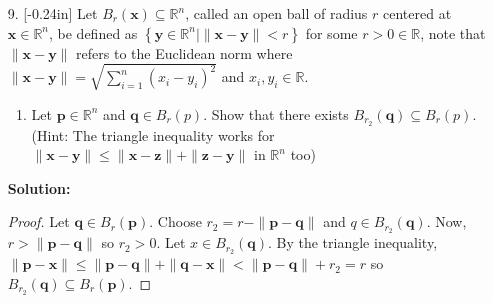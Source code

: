\documentclass[letterpaper,12pt]{article}
\newcommand{\set}[1]{\left\{ #1 \right\}}
\theoremstyle{definition}
\begin{document}
\pagebreak
\begin{enumerate}
    \item[9.] \reversemarginpar{}[-0.24in] 
 Let $B_r(\mathbf{x}) \subseteq \mathbb{R}^n$, called an open ball of radius $r$ centered at $\mathbf{x} \in \mathbb{R}^n$, be defined as $\set{\mathbf{y} \in \mathbb{R}^n | \| \mathbf{x}-\mathbf{y} \| < r}$ for some $r > 0 \in \mathbb{R}$, note that $\| \mathbf{x}-\mathbf{y} \|$ refers to the Euclidean norm where $\| \mathbf{x}-\mathbf{y} \| = \sqrt{\sum_{i=1}^n (x_i - y_i)^2}$ and $x_i,y_i \in \mathbb{R}$. \begin{enumerate}
        \item Let $\mathbf{p} \in \mathbb{R}^n$ and $\mathbf{q} \in B_r(p)$. Show that there exists $B_{r_2}(\mathbf{q}) \subseteq B_r(p)$. (Hint: The triangle inequality works for $\|\mathbf{x} - \mathbf{y}\| \leq \|\mathbf{x} - \mathbf{z}\| + \|\mathbf{z} -\mathbf{y} \|$ in $\mathbb{R}^n$ too)
    \end{enumerate}
      \begin{mdframed}
            \textbf{Solution:}
            \begin{proof}
                Let $\mathbf{q} \in B_r(\mathbf{p})$. Choose $r_2 = r - \| \mathbf{p}-\mathbf{q}\|$ and $q \in B_{r_2}(\mathbf{q})$. Now, $r > \|  \mathbf{p}-\mathbf{q}\|$ so $r_2 > 0$. Let $x \in B_{r_2}(\mathbf{q})$. By the triangle inequality, $\|\mathbf{p}-\mathbf{x} \| \leq \| \mathbf{p}-\mathbf{q}\| + \|\mathbf{q}-\mathbf{x}\| < \|\mathbf{p}-\mathbf{q}\| + r_2 = r$ so $B_{r_2}(\mathbf{q}) \subseteq B_r(\mathbf{p})$. 
            \end{proof}
        \end{mdframed}
\end{enumerate}
\pagebreak
\end{document}
